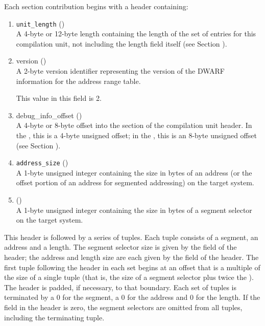 Each 
\bb
\dotdebugaranges{} section contribution
begins with a header containing:
\eb
\begin{enumerate}[1. ]

\item \texttt{unit\_length} () \\
A 4-byte or 12-byte length containing the length of the
set of entries for this compilation unit, not including the
length field itself
\bb
(see Section ).
\eb

\item version (\HFTuhalf) \\
A 2-byte version identifier representing the version of the
DWARF information for the address range table.

This value in this field  is 2. 
 
\item debug\_info\_offset () \\
A 
4-byte or 8-byte offset into the 
\dotdebuginfo{} section of
the compilation unit header. In the \thirtytwobitdwarfformat,
this is a 4-byte unsigned offset; in the \sixtyfourbitdwarfformat,
this is an 8-byte unsigned offset 
(see Section ).

\item \texttt{address\_size} (\HFTubyte) \\
A 1-byte unsigned integer containing the size in bytes of an
address 
(or the offset portion of an address for segmented
addressing) on the target system.

\item \HFNsegmentselectorsize{} (\HFTubyte) \\
A 1-byte unsigned integer containing the size in bytes of a
segment selector on the target system.

\end{enumerate}

This header is followed by a series of tuples. Each tuple
consists of a segment, an address and a length. 
The segment selector
size is given by the \HFNsegmentselectorsize{} field of the header; the
address and length size are each given by the 
field of the header. 
The first tuple following the header in
each set begins at an offset that is a multiple of the size
of a single tuple (that is, the size of a segment selector
plus twice the ). 
The header is padded, if
necessary, to that boundary. Each set of tuples is terminated
by a 0 for the segment, a 0 for the address and 0 for the
length. If the \HFNsegmentselectorsize{} field in the header is zero,
the segment selectors are omitted from all tuples, including
the terminating tuple.


